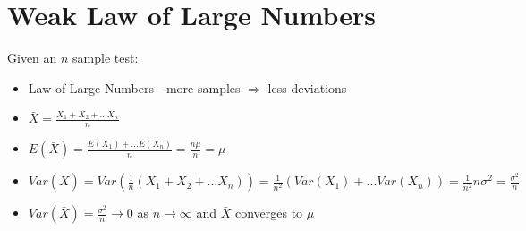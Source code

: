 \documentclass[a4paper]{article}
\begin{document}
\section{Weak Law of Large Numbers}
Given an $n$ sample test:
\begin{itemize}
    \item Law of Large Numbers - more samples $\Rightarrow$ less deviations
    \item $\bar X = \frac{X_1 + X_2 +...X_n}{n}$
    \item $E(\bar X) = \frac{E(X_1) + ...E(X_n)}{n} = \frac{n\mu}{n} = \mu$
    \item $Var(\bar X) = Var(\frac{1}{n} (X_1 + X_2 + ... X_n)) = \frac{1}{n^2}(Var(X_1) + ... Var(X_n)) = \frac{1}{n^2}n\sigma^2 = \frac{\sigma^2}{n}$
    \item $Var(\bar X) = \frac{\sigma^2}{n} \rightarrow 0$ as $n \rightarrow \infty$ and $\bar X $ converges to $\mu$
\end{itemize}
\end{document}
